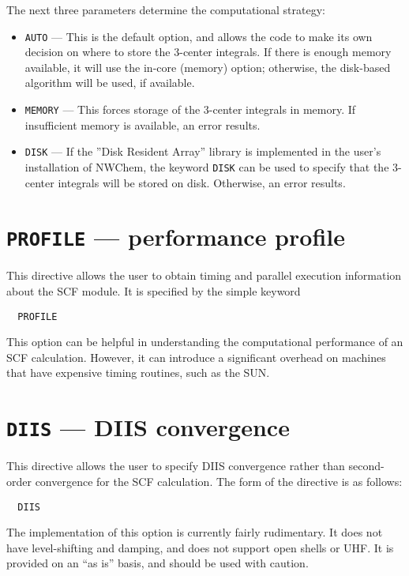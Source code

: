 The next three parameters determine the computational strategy:
\begin{itemize}
\item \verb+AUTO+ --- This is the default option, and allows the code
  to make its own decision on where to store the 3-center integrals.
  If there is enough memory available, it will use the in-core (memory) option;
  otherwise, the disk-based algorithm will be used, if available.

\item \verb+MEMORY+ --- This forces storage of the 3-center integrals
  in memory.  If insufficient memory is available, an error results.

\item \verb+DISK+ --- If the ''Disk Resident Array'' library is
  implemented in the user's installation of NWChem, the keyword
  \verb+DISK+ can be used to specify that the 3-center integrals will
  be stored on disk.  Otherwise, an error results.
\end{itemize}

\section{{\tt PROFILE} --- performance profile}

This directive allows the user to obtain timing and parallel
execution information about the SCF module.  It is specified by the
simple keyword

\begin{verbatim}
  PROFILE
\end{verbatim}

This option can be helpful in understanding the computational
performance of an SCF calculation.  However,
it can introduce a significant overhead 
on machines that have expensive timing routines, such as the SUN.

\section{{\tt DIIS} --- DIIS convergence}

This directive allows the user to specify DIIS convergence rather than
second-order convergence for the SCF calculation.  The form of the
directive is as follows:

\begin{verbatim}
  DIIS
\end{verbatim}

The implementation of this option is currently fairly rudimentary.  It
does not have level-shifting and damping, and does not support open
shells or UHF.  It is provided on an ``as is'' basis, and should be
used with caution.

